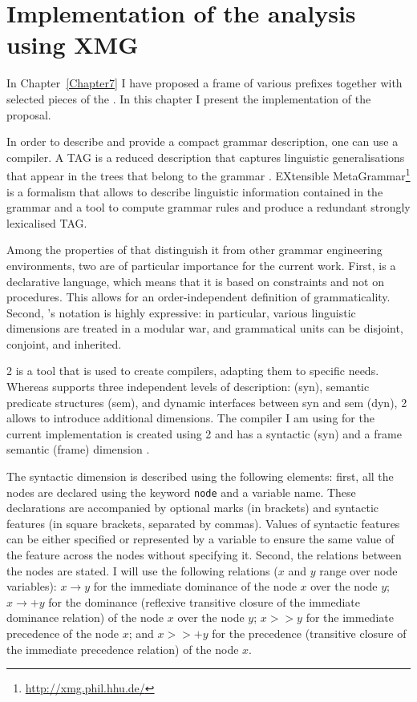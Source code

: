 
\chapter{Implementation of the analysis using XMG} %
\label{Chapter8}
In Chapter~\ref{Chapter7} I have proposed a frame  of various prefixes together with selected pieces of the . In this chapter I present the implementation of the proposal.

 In order to describe and provide a compact grammar description, one can use a  compiler. A TAG  is a reduced description that captures linguistic generalisations that appear in the trees that belong to the grammar \citep{Candito:99}. EXtensible MetaGrammar\footnote{\url{http://xmg.phil.hhu.de/}} \citep[][]{Crabbe:13} is a formalism that allows to describe linguistic information contained in the grammar and a tool to compute grammar rules and produce a redundant strongly lexicalised TAG. 
 
Among the properties of  that distinguish it from other grammar engineering environments, two are of particular importance for the current work. First,  is a declarative language, which means that it is based on constraints and not on procedures. This allows for an order-independent definition of grammaticality. Second, 's notation is highly expressive: in particular, various linguistic dimensions are treated in a modular war, and grammatical units can be disjoint, conjoint, and inherited.
 
  2 \citep{Petitjean:16} is a tool that is used to create  compilers, adapting them to specific needs. Whereas  supports three independent levels of description:  (syn), semantic predicate structures (sem), and dynamic interfaces between syn and sem (dyn),  2 allows to introduce additional dimensions. The compiler I am using for the current implementation is created using  2 and has a syntactic (syn) and a frame semantic (frame) dimension  \citep{Lichte:15}.

The syntactic dimension is described using the following elements: first, all the nodes are declared using the keyword \texttt{node} and a variable name. These declarations are accompanied by optional marks (in brackets) and syntactic features (in square brackets, separated by commas). Values of syntactic features can be either specified or represented by a variable to ensure the same value of the feature across the nodes without specifying it. Second, the relations between the nodes are stated. I will use the following relations ($x$ and $y$ range over node variables): $x \rightarrow y$ for the immediate dominance of the node $x$ over the node $y$; $x \rightarrow + y$ for the dominance (reflexive transitive closure of the immediate dominance relation) of the node $x$ over the node $y$; 
$x >> y$ for the immediate precedence of the node $x$; and $x >>+ y$ for the precedence (transitive closure of the immediate precedence relation) of the node $x$.


